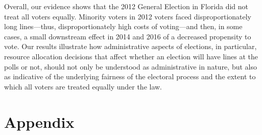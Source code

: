 \documentclass[12pt,titlepage]{article}
\begin{document}




Overall, our evidence shows that the 2012 General Election in Florida
did not treat all voters equally.  Minority voters in 2012 voters
faced disproportionately long lines---thus, disproportionately high
costs of voting---and then, in some cases, a small downstream effect
in 2014 and 2016 of a decreased propensity to vote.  Our results
illustrate how administrative aspects of elections, in particular,
resource allocation decisions that affect whether an election will
have lines at the polls or not, should not only be understood as
administrative in nature, but also as indicative of the underlying
fairness of the electoral process and the extent to which all voters
are treated equally under the law.




% 

\clearpage
\newpage




\newpage
\appendix
\section*{Appendix}


\end{document}
